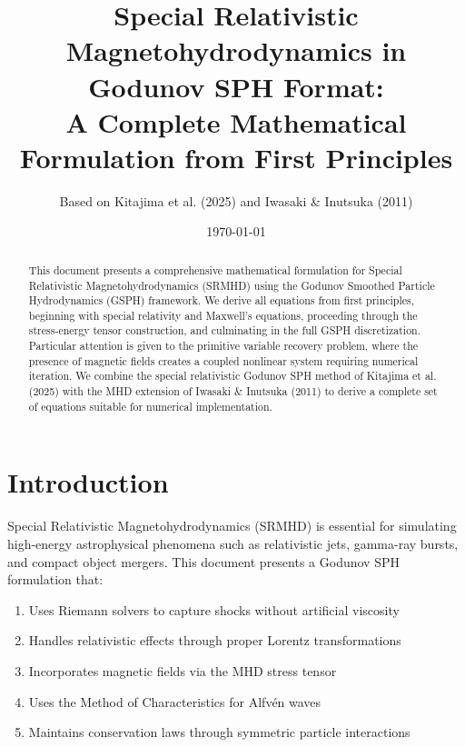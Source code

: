 \documentclass[12pt,a4paper]{article}
\title{Special Relativistic Magnetohydrodynamics in Godunov SPH Format:\\
A Complete Mathematical Formulation from First Principles}
\author{Based on Kitajima et al. (2025) and Iwasaki \& Inutsuka (2011)}
\date{\today}
\begin{document}
\maketitle

\begin{abstract}
This document presents a comprehensive mathematical formulation for Special Relativistic
Magnetohydrodynamics (SRMHD) using the Godunov Smoothed Particle Hydrodynamics (GSPH) framework.
We derive all equations from first principles, beginning with special relativity and Maxwell's
equations, proceeding through the stress-energy tensor construction, and culminating in the
full GSPH discretization. Particular attention is given to the primitive variable recovery
problem, where the presence of magnetic fields creates a coupled nonlinear system requiring
numerical iteration. We combine the special relativistic Godunov SPH method of Kitajima et al. (2025)
with the MHD extension of Iwasaki \& Inutsuka (2011) to derive a complete set of equations
suitable for numerical implementation.
\end{abstract}

\tableofcontents
\newpage

\section{Introduction}

Special Relativistic Magnetohydrodynamics (SRMHD) is essential for simulating high-energy
astrophysical phenomena such as relativistic jets, gamma-ray bursts, and compact object
mergers. This document presents a Godunov SPH formulation that:

\begin{enumerate}
    \item Uses Riemann solvers to capture shocks without artificial viscosity
    \item Handles relativistic effects through proper Lorentz transformations
    \item Incorporates magnetic fields via the MHD stress tensor
    \item Uses the Method of Characteristics for Alfv\'en waves
    \item Maintains conservation laws through symmetric particle interactions
\end{enumerate}
\end{document}
